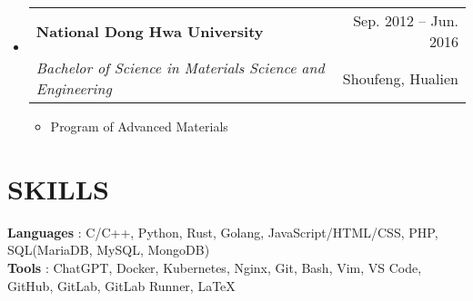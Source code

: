\documentclass[letterpaper,11pt]{article}
\makeatletter
\newcommand{\resumeItem}[1]{
  \item\small{
    {#1 \vspace{-1pt}}
  }
}
\newcommand{\resumeSubheading}[4]{
  \vspace{-1pt}\item
    \begin{tabular*}{\textwidth}[t]{l@{\extracolsep{\fill}}r}
      \textbf{#1} & {\color{dark-grey}\small #2}\vspace{1pt}\\ %
      \textit{#3} & {\color{dark-grey} \small #4}\\ %
    \end{tabular*}\vspace{-4pt}
}
\newcommand{\resumeSubHeadingListStart}{\begin{itemize}[leftmargin=0in, label={}]}
\newcommand{\resumeSubHeadingListEnd}{\end{itemize}}
\newcommand{\resumeItemListStart}{\begin{itemize}}
\newcommand{\resumeItemListEnd}{\end{itemize}\vspace{0pt}}
\makeatother
\begin{document}
\resumeSubHeadingListStart
\resumeSubheading
  {National Dong Hwa University}{Sep. 2012 -- Jun. 2016}
  {Bachelor of Science in Materials Science and Engineering}{Shoufeng, Hualien}
    \resumeItemListStart
  \resumeItem {Program of Advanced Materials}

    \resumeItemListEnd
\resumeSubHeadingListEnd




%
\section{SKILLS}
 \begin{itemize}[leftmargin=0in, label={}]
    \small{\item{
     \textbf{Languages} {: C/C++, Python, Rust, Golang, JavaScript/HTML/CSS, PHP, SQL(MariaDB, MySQL, MongoDB)}\vspace{2pt} \\
     \textbf{Tools}     {: ChatGPT, Docker, Kubernetes, Nginx, Git, Bash, Vim, VS Code, GitHub, GitLab, GitLab Runner, LaTeX}
    }}
 \end{itemize}


\end{document}

